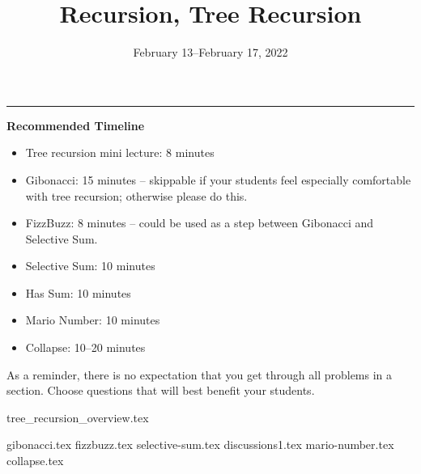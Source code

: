 \documentclass{exam}
\title{Recursion, Tree Recursion}
\date{February 13--February 17, 2022}
\begin{document}
\maketitle
\rule{\textwidth}{0.15em}
\fontsize{12}{15}\selectfont

\begin{meta}
\textbf{Recommended Timeline}
\begin{itemize}
    \item Tree recursion mini lecture: 8 minutes
    \item Gibonacci: 15 minutes -- skippable if your students feel especially comfortable with tree recursion; otherwise please do this.
    \item FizzBuzz: 8 minutes -- could be used as a step between Gibonacci and Selective Sum.
    \item Selective Sum: 10 minutes
    \item Has Sum: 10 minutes
    \item Mario Number: 10 minutes
    \item Collapse: 10--20 minutes
\end{itemize}
As a reminder, there is no expectation that you get through all problems in a section. Choose questions that will best benefit your students.
\end{meta}

{tree_recursion_overview.tex}
\begin{questions}
    {gibonacci.tex}
    {fizzbuzz.tex}
    {selective-sum.tex}
    {discussions1.tex} 
    {mario-number.tex}
    {collapse.tex}
\end{questions}
\end{document}
